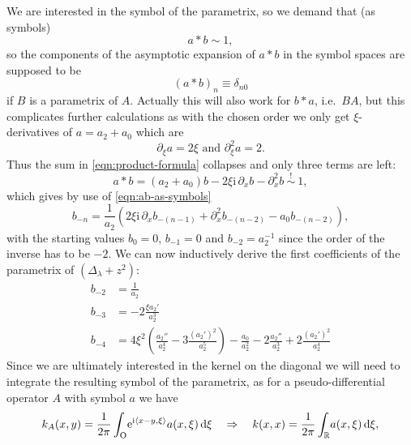 We are interested in the symbol of the parametrix, so we demand that (as
symbols)
\begin{equation*}
  a * b \sim 1,
\end{equation*}
so the components of the asymptotic expansion of $a * b$ in the symbol spaces
are supposed to be
\begin{equation}
  \label{eqn:ab-as-symbols}
  (a * b)_n \equiv \delta_{n0}
\end{equation}
if $B$ is a parametrix of $A$. Actually this will
also work for $b * a$, i.e.\ $BA$, but this complicates further calculations as
with the chosen order we only get $\xi$-derivatives of $a = a_2 + a_0$ which
are
\begin{equation}
  \partial_{\xi} a = 2\xi \text{ and } \partial_{\xi}^2 a = 2.
\end{equation}
Thus the sum in \cref{eqn:product-formula} collapses and only three terms are
left:
\begin{equation*}
  a * b = (a_2 + a_0)b - 2\xi\mathrm i\,\partial_x b - \partial_x^2 b
  \ \mathrel{\overset{!}{\sim}}\ 1,
\end{equation*}
which gives by use of \cref{eqn:ab-as-symbols}
\begin{equation}
  \label{eqn:int-recursion}
  b_{-n} = \frac1{a_2} \left( 2\xi\mathrm i\, \partial_x b_{-(n-1)}
  + \partial_x^2 b_{-(n-2)} - a_0 b_{-(n-2)} \right),
\end{equation}
with the starting values $b_0 = 0$, $b_{-1} = 0$ and $b_{-2} = a_2^{-1}$ since
the order of the inverse has to be $-2$. We can now inductively derive the first
coefficients of the parametrix of $(\Delta_\lambda + z^2)$:
\begin{equation}
  \label{eqn:coeff-symbol}
  \begin{split}
    b_{-2} &= \frac{1}{a_2} \\
    b_{-3} &= -2\frac{\xi a_2'}{a_2^3}\\
    b_{-4} &= 4\xi^2\left(\frac{a_2''}{a_2^4}
    - 3\frac{(a_2')^2}{a_2^5}\right) - \frac{a_0}{a_2^2}
    - 2\frac{a_2''}{a_2^3} + 2\frac{(a_2')^2}{a_2^4}
  \end{split}
\end{equation}
Since we are ultimately interested in the kernel on the diagonal we will need to
integrate the resulting symbol of the parametrix, as for a pseudo-differential
operator $A$ with symbol $a$ we have
\begin{equation*}
  k_A(x,y) = \frac{1}{2\pi}\int_{\mathrm O}^{}\!
    \mathrm e^{\mathrm i\left\langle x-y, \xi\right\rangle} a(x,\xi)
  \,\mathrm d{\xi}
  \quad
  \Rightarrow
  \quad
  k(x,x) = \frac{1}{2\pi}\int_{\mathbb{R}}^{}\!a(x,\xi)\,\mathrm d{\xi},
\end{equation*}
